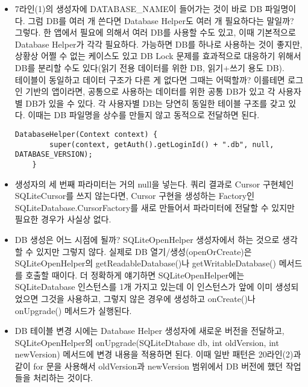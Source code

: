 \begin{itemize}
\item 7라인(1)의 생성자에 DATABASE\_NAME이 들어가는 것이 바로 DB 파일명이다.
그럼 DB를 여러 개 쓴다면 Database Helper도 여러 개 필요하다는 말일까? 그렇다. 한 앱에서 필요에 의해서 여러 DB를 사용할 수도 있고, 이때 기본적으로 Database Helper가 각각 필요하다.
가능하면 DB를 하나로 사용하는 것이 좋지만, 상황상 어쩔 수 없는 케이스도 있고 DB Lock 문제를 효과적으로 대응하기 위해서 DB를 분리할 수도 있다(읽기 전용 데이터를 위한 DB, 읽기+쓰기 용도 DB).\\

테이블이 동일하고 데이터 구조가 다른 게 없다면 그때는 어떡할까? 이를테면 로그인 기반의 앱이라면, 공통으로 사용하는 데이터를 위한 공통 DB가 있고 각 사용자별 DB가 있을 수 있다. 각 사용자별 DB는 당연히 동일한 테이블 구조를 갖고 있다. 이때는 DB 파일명을 상수를 만들지 않고 동적으로 전달하면 된다.
\begin{lstlisting}[frame=single] 
    DatabaseHelper(Context context) {
        super(context, getAuth().getLoginId() + ".db", null, DATABASE_VERSION);
    }
\end{lstlisting}

\item 생성자의 세 번째 파라미터는 거의 null을 넣는다. 
쿼리 결과로 Cursor 구현체인 SQLiteCursor를 쓰지 않는다면, Cursor 구현을 생성하는 Factory인 
SQLiteDatabase.CursorFactory를 새로 만들어서 파라미터에 전달할 수 있지만 필요한 경우가 사실상 없다.

\item DB 생성은 어느 시점에 될까? SQLiteOpenHelper 생성자에서 하는 것으로 생각할 수 있지만 그렇지 않다.
실제로 DB 열기/생성(openOrCreate)은 SQLiteOpenHelper의 getReadableDatabase()나 getWritableDatabase() 메서드를 호출할 때이다.
더 정확하게 얘기하면 SQLiteOpenHelper에는 SQLiteDatabase 인스턴스를 1개 가지고 있는데 이 인스턴스가 앞에 이미 생성되었으면 그것을 사용하고, 그렇지 않은 경우에 생성하고 onCreate()나 onUpgrade() 메서드가 실행된다.

\item DB 테이블 변경 시에는 Database Helper 생성자에 새로운 버전을 전달하고, 
SQLiteOpenHelper의 onUpgrade(SQLiteDtabase db, int oldVersion, int newVersion) 메서드에 변경 내용을 적용하면 된다. 이때 일반 패턴은 20라인(2)과 같이 for 문을 사용해서 oldVersion과 newVersion 범위에서 DB 버전에 했던 작업들을 처리하는 것이다.


\end{itemize}
